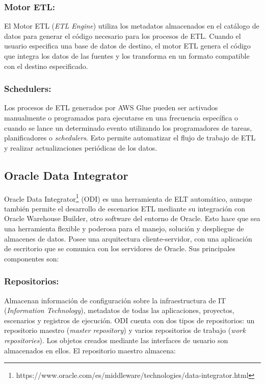 \subsubsection{Motor ETL:}
El Motor ETL (\emph{ETL Engine}) utiliza los metadatos almacenados en el catálogo de datos para generar el código 
necesario para los procesos de ETL. Cuando el usuario especifica una base de datos de destino, el motor ETL genera el 
código que integra los datos de las fuentes y los transforma en un formato compatible con el destino especificado.

\subsubsection{Schedulers:}
Los procesos de ETL generados por AWS Glue pueden ser activados manualmente o programados para ejecutarse en 
una frecuencia específica o cuando se lance un determinado evento utilizando los programadores de tareas, 
planificadores o \emph{schedulers}. Esto permite automatizar el 
flujo de trabajo de ETL y realizar actualizaciones periódicas de los datos.


\subsection{Oracle Data Integrator}

Oracle Data Integrator\footnote{https://www.oracle.com/es/middleware/technologies/data-integrator.html} (ODI) 
es una herramienta de ELT automático, aunque también permite el desarrollo de escenarios 
ETL mediante su integración con Oracle Warehouse Builder, otro software del entorno de Oracle. Esto hace que sea una 
herramienta flexible y poderosa para el manejo, solución y despliegue de almacenes de datos. Posee una arquitectura 
cliente-servidor, con una aplicación de escritorio que se comunica con los servidores de Oracle. Sus principales 
componentes son\cite{corporation_overview_nodate}: 

\subsubsection{Repositorios:} 
Almacenan información de configuración sobre la infraestructura de IT (\emph{Information Technology}), metadatos de todas las aplicaciones, proyectos, 
escenarios y registros de ejecución. ODI cuenta con dos tipos de repositorios: un repositorio maestro (\emph{master repository}) 
y varios repositorios de trabajo (\emph{work repositories}). Los objetos creados mediante las interfaces de usuario son almacenados 
en ellos. El repositorio maestro almacena:

